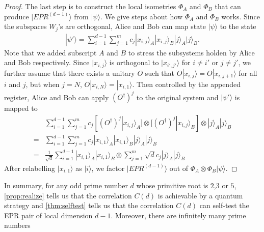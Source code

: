 \documentclass[11pt,letterpaper]{article}
\newcommand{\ket}[1]{|#1\rangle}
\newcommand{\ketbra}[2]{|#1\rangle\langle#2|}
\newcommand{\x}{\otimes}
\newcommand{\ct}{^{\dagger}}
\DeclareMathOperator{\Tr}{Tr}
\DeclareMathOperator{\supp}{supp}
\newcommand{\1}{\mathbb{1}}
\newcommand{\CHSH}{CHSH^{(d)}}
\newcommand{\SVT}{SVT}
\newcommand{\EPR}[1]{EPR^{(#1)}}
\newcommand{\tA}{\tilde{A}}
\theoremstyle{definition}
\begin{document}
\begin{proof}
The last step is to construct the local isometries $\Phi_A$ and $\Phi_B$ that can produce $\ket{\EPR{d-1}}$ from $\ket{\psi}$.
We give steps about how $\Phi_A$ and $\Phi_B$ works.
Since the subspaces $W_j$'s are orthogonal, Alice and Bob can map state $\ket{\psi}$ to the state 
\begin{align}
	\ket{\psi'} = \sum_{i=1}^{d-1}\sum_{j=1}^m c_j \ket{x_{i,j}}_A\ket{x_{i,j}}_B \ket{j}_A\ket{j}_B.
\end{align}
Note that we added subscript $A$ and $B$ to stress the subsystems holden by Alice and Bob respectively.
Since $\ket{x_{i,j}}$ is orthogonal to $\ket{x_{i',j'}}$ for $i\neq i'$ or $j \neq j'$, we further assume that there exists 
a unitary $O$ such that $O\ket{x_{i,j}} = O\ket{x_{i,j+1}}$ for all $i$ and $j$, but when $j = N$, $O\ket{x_{i,N}} = \ket{x_{i,1}}$.
Then controlled by the appended register, Alice and Bob can apply $(O\ct)^j$ to the original system
and $\ket{\psi'}$ is mapped to
\begin{align}
	 &\sum_{i=1}^{d-1}\sum_{j=1}^m c_j [(O\ct)^j\ket{x_{i,j}}_A] \x [(O\ct)^j\ket{x_{i,j}}_B] \x \ket{j}_A\ket{j}_B\\
	 = &\sum_{i=1}^{d-1}\sum_{j=1}^m c_j \ket{x_{i,1}}_A\ket{x_{i,1}}_B \ket{j}_A\ket{j}_B\\
	 =  &\frac{1}{\sqrt{d}} \sum_{i=1}^{d-1} \ket{x_{i,1}}_A\ket{x_{i,1}}_B \x \sum_{j=1}^m \sqrt{d}c_j \ket{j}_A\ket{j}_B
\end{align}
After relabelling $\ket{x_{i,1}}$ as $\ket{i}$, we factor $\ket{\EPR{d-1}}$ out of $\Phi_A \x \Phi_B \ket{\psi}$.
\end{proof}
In summary, for any odd prime number $d$ whose primitive root is $2$,$3$ or $5$, 
\cref{prop:realize} tells us that the correlation $C(d)$ is achievable by a quantum strategy 
and \cref{thm:selftest} tells us that the correlation $C(d)$ can self-test the EPR pair of
local dimension $d-1$. Moreover, there are infinitely many prime numbers
\end{document}

